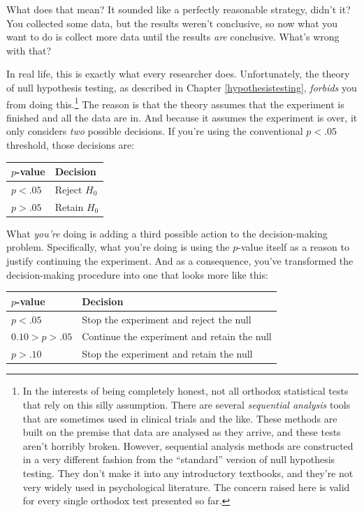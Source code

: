 \documentclass[
]{book}
\theoremstyle{definition}
\theoremstyle{definition}
\theoremstyle{definition}
\theoremstyle{definition}
\theoremstyle{remark}
\begin{document}
What does that mean? It sounded like a perfectly reasonable strategy, didn't it? You collected some data, but the results weren't conclusive, so now what you want to do is collect more data until the results \emph{are} conclusive. What's wrong with that?

In real life, this is exactly what every researcher does. Unfortunately, the theory of null hypothesis testing, as described in Chapter \ref{hypothesistesting}, \emph{forbids} you from doing this.\footnote{In the interests of being completely honest, not all orthodox statistical tests that rely on this silly assumption. There are several \emph{sequential analysis} tools that are sometimes used in clinical trials and the like. These methods are built on the premise that data are analysed as they arrive, and these tests aren't horribly broken. However, sequential analysis methods are constructed in a very different fashion from the ``standard'' version of null hypothesis testing. They don't make it into any introductory textbooks, and they're not very widely used in psychological literature. The concern raised here is valid for every single orthodox test presented so far.} The reason is that the theory assumes that the experiment is finished and all the data are in. And because it assumes the experiment is over, it only considers \emph{two} possible decisions. If you're using the conventional \(p<.05\) threshold, those decisions are:

\begin{longtable}[]{@{}ll@{}}
\toprule()
\(p\)-value & Decision \\
\midrule()
\endhead
\(p < .05\) & Reject \(H_0\) \\
\(p > .05\) & Retain \(H_0\) \\
\bottomrule()
\end{longtable}

What \emph{you're} doing is adding a third possible action to the decision-making problem. Specifically, what you're doing is using the \(p\)-value itself as a reason to justify continuing the experiment. And as a consequence, you've transformed the decision-making procedure into one that looks more like this:

\begin{longtable}[]{@{}ll@{}}
\toprule()
\(p\)-value & Decision \\
\midrule()
\endhead
\(p < .05\) & Stop the experiment and reject the null \\
\(0.10 > p > .05\) & Continue the experiment and retain the null \\
\(p > .10\) & Stop the experiment and retain the null \\
\bottomrule()
\end{longtable}
\end{document}
